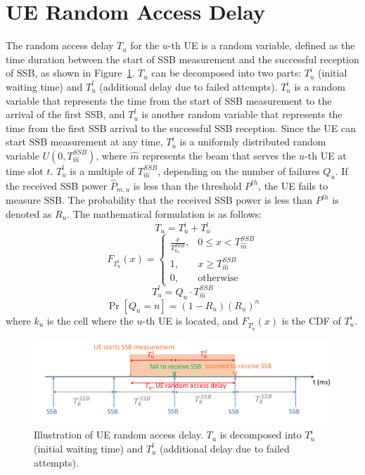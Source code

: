 \section{UE Random Access Delay}
The random access delay $T_u$ for the $u$-th UE is a random variable, defined as the time duration between the start of SSB measurement and the successful reception of SSB, as shown in Figure~\ref{RAD}. $T_u$ can be decomposed into two parts: $T_u^i$ (initial waiting time) and $T_u^l$ (additional delay due to failed attempts). $T_u^i$ is a random variable that represents the time from the start of SSB measurement to the arrival of the first SSB, and $T_u^l$ is another random variable that represents the time from the first SSB arrival to the successful SSB reception. Since the UE can start SSB measurement at any time, $T_u^i$ is a uniformly distributed random variable $U(0, T_{\hat{m}}^{SSB})$, where $\hat{m}$ represents the beam that serves the $u$-th UE at time slot $t$. $T_u^l$ is a multiple of $T_{\hat{m}}^{SSB}$, depending on the number of failures $Q_u$. If the received SSB power $\hat{P}_{m, u}$ is less than the threshold $P^{th}$, the UE fails to measure SSB. The probability that the received SSB power is less than $P^{th}$ is denoted as $R_u$. The mathematical formulation is as follows:
\begin{equation}
    T_u = T_u^i + T_u^l
\end{equation}
\begin{equation}
    F_{T_u^i}(x) =
    \begin{cases}
        \frac{x}{T_{k_u}^{SSB}}, & 0 \leq x < T_{\hat{m}}^{SSB} \\
        1, & x \geq T_{\hat{m}}^{SSB} \\
        0, & \text{otherwise}
    \end{cases}
\end{equation}
\begin{equation}
    T_u^l = Q_u \cdot T_{\hat{m}}^{SSB}
\end{equation}
\begin{equation}
    \Pr\left[Q_u = n\right] = (1 - R_u) (R_u)^n
\end{equation}
where $k_u$ is the cell where the $u$-th UE is located, and $F_{T_u^i}(x)$ is the CDF of $T_u^i$.

\begin{figure}[h!]
    \centering
    \includegraphics[width=1\textwidth]{figure/random access delay.pdf}
    \caption{Illustration of UE random access delay. $T_u$ is decomposed into $T_u^i$ (initial waiting time) and $T_u^l$ (additional delay due to failed attempts).}
    \label{RAD}
\end{figure}

